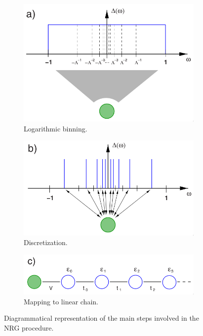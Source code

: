 \begin{figure}
  \centering
  \begin{subfigure}[b]{0.3\linewidth}
    \centering
    \includegraphics[width=\linewidth]{./gfx/nrg-a.png}
    \caption{Logarithmic binning.}
    \label{fig:4-nrg-schematics-a}
  \end{subfigure}
  \begin{subfigure}[b]{0.3\linewidth}
    \centering
    \includegraphics[width=\linewidth]{./gfx/nrg-b.png}
    \caption{Discretization.}
    \label{fig:4-nrg-schematics-b}
  \end{subfigure}
  \begin{subfigure}[b]{0.3\linewidth}
    \centering
    \includegraphics[width=\linewidth]{./gfx/nrg-c.png}
    \caption{Mapping to linear chain.}
    \label{fig:4-nrg-schematics-c}
  \end{subfigure}
  \caption{Diagrammatical representation of the main steps involved in the NRG procedure.}
  \label{fig:4-nrg-schematics}
\end{figure}

